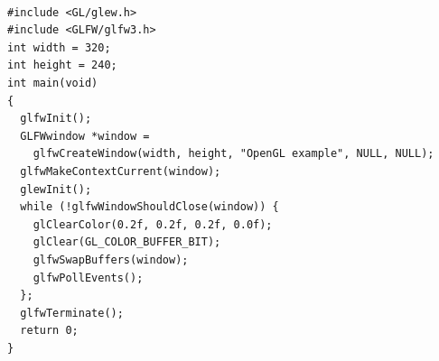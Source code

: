\documentclass[calcdimensions,landscape,letterpaper]{powersem}
\newcommand{\thecurrentheading}{}
\newcommand{\heading}[1]{\renewcommand{\thecurrentheading}{#1}}
\begin{document}
\begin{slide}
  \heading{GLFW}
  \begin{center}
    \\
  \end{center}
\end{slide}

\begin{slide}
    \heading{GLFW Window}
    \begin{center}
        \begin{minipage}[c]{.98\textwidth}
            \begin{verbatim}
#include <GL/glew.h>
#include <GLFW/glfw3.h>
int width = 320;
int height = 240;
int main(void)
{
  glfwInit();
  GLFWwindow *window =
    glfwCreateWindow(width, height, "OpenGL example", NULL, NULL);
  glfwMakeContextCurrent(window);
  glewInit();
  while (!glfwWindowShouldClose(window)) {
    glClearColor(0.2f, 0.2f, 0.2f, 0.0f);
    glClear(GL_COLOR_BUFFER_BIT);
    glfwSwapBuffers(window);
    glfwPollEvents();
  };
  glfwTerminate();
  return 0;
}
            \end{verbatim}
        \end{minipage}
    \end{center}
\end{slide}
\end{document}
